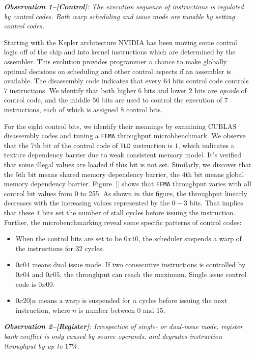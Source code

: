 \documentclass{sig-alternate-05-2015}
\begin{document}
{\em {\bf Observation 1--[Control]}: The execution sequence of instructions is regulated by control codes. Both warp scheduling and issue mode are tunable by setting control codes.}

Starting with the Kepler architecture NVIDIA has been moving some control logic off of the chip and into kernel instructions which are determined by the assembler. This evolution provides programmer a chance to make globally optimal decisions on scheduling and other control aspects if an assembler is available. The disassembly code indicates that every 64 bits control code controls $7$ instructions. We identify that both higher $6$ bits and lower 2 bits are {\em opcode} of control code, and the middle 56 bits are used to control the execution of $7$ instructions, each of which is assigned $8$ control bits.

For the eight control bits, we identify their meanings by examining CUBLAS disassembly codes and tuning a {\tt FFMA} throughput microbhenchmark. We observe that the $7$th bit of the control code of {\tt TLD} instruction is $1$, which indicates a texture dependency barrier due to weak consistent memory model. It's verified that some illegal values are loaded if this bit is not set. Similarly, we discover that the $5$th bit means shared memory dependency barrier, the $4$th bit means global memory dependency barrier. Figure~\ref{} shows that {\tt FFMA} throughput varies with all control bit values from 0 to 255. As shown in this figure, the throughput linearly decreases with the increasing values represented by the $0-3$ bits. That implies that these $4$ bits set the number of stall cycles before issuing the instruction. Further, the microbenchmarking reveal some specific patterns of control codes:

\begin{itemize}
\item When the control bits are set to be $0x40$, the scheduler suspends a warp of the instructions for 32 cycles.
\item $0x04$ means dual issue mode. If two consecutive instructions is controlled by $0x04$ and $0x05$, the throughput can reach the maximum. Single issue control code is $0x00$.
\item $0x20|n$ means a warp is suspended for $n$ cycles before issuing the next instruction, where $n$ is number between 0 and 15.
\end{itemize}


{\em {\bf Observation 2--[Register]}: Irrespective of single- or dual-issue mode, register bank conflict is only caused by source operands, and degrades instruction throughput by up to $17\%$.}
\end{document}
